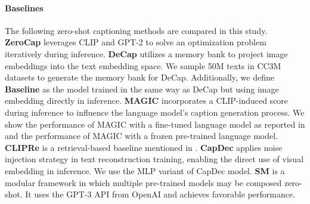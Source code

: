 \paragraph{\textbf{Baselines}} 
The following zero-shot captioning methods are compared in this study. \textbf{ZeroCap} leverages CLIP and GPT-2 to solve an optimization problem iteratively during inference. \textbf{DeCap} \cite{DeCap} utilizes a memory bank to project image embeddings into the text embedding space. We sample 50M texts in CC3M \cite{cc3m} datasets to generate the memory bank for DeCap. Additionally, we define \textbf{Baseline} as the model trained in the same way as DeCap but using image embedding directly in inference.
\textbf{MAGIC} \cite{MAGIC} incorporates a CLIP-induced score during inference to influence the language model's caption generation process. We show the performance of MAGIC with a fine-tuned language model as reported in \cite{MAGIC} and the performance of MAGIC with a frozen pre-trained language model. \textbf{CLIPRe} is a retrieval-based baseline mentioned in \cite{MAGIC}. \textbf{CapDec} \cite{CapDec} applies noise injection strategy in text reconstruction training, enabling the direct use of visual embedding in inference. We use the MLP variant of CapDec model. \textbf{SM} \cite{Zeng2022SocraticMC} is a modular framework in which multiple pre-trained models may be composed zero-shot. It uses the GPT-3 \cite{gpt3} API from OpenAI and achieves favorable performance.



